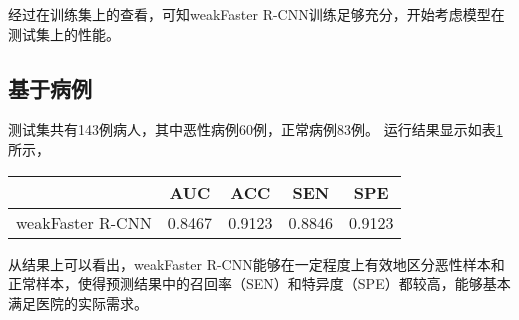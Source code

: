 \begin{comment}
此时体现的几个基于病例的指标结果如下：
\begin{itemize}
	\item 召回率88\%
	\item 精确度90\%
	\item 准确率91\%
\end{itemize}

预测结果如表\ref{tab:2_stage_2_pred_result_in_testing_set}所示，其中TP为51例，TN为71例，FP为12例，FN为9例。。
\begin{table}[!htbp]
    \bicaption{weakFaster R-CNN第二阶段测试集预测结果}{
The prediction result of testing set in the second stage of weakFaster R-CNN}
    \label{tab:2_stage_2_pred_result_in_testing_set}
    \centering
    \footnotesize%
    \setlength{\tabcolsep}{4pt}%
    \renewcommand{\arraystretch}{1.2}%
    \begin{tabular}{ccc}
        \hline
        &真实为恶性(60例)& 真实为良阴性（83例）\\
        \hline
        预测为恶性& 51 &12 \\
        预测为良阴性& 9 &71 \\
        \hline
    \end{tabular}
\end{table}
召回率为85\%，精确度为81\%，准确率为85\%。
\end{comment}
经过在训练集上的查看，可知weakFaster R-CNN训练足够充分，开始考虑模型在测试集上的性能。
\subsection{基于病例}
测试集共有143例病人，其中恶性病例60例，正常病例83例。
运行结果显示如表\ref{tab:2_stage_2_pred_result_based_on_patient}所示，
\begin{table}[!htbp]
    \label{tab:2_stage_2_pred_result_based_on_patient}
    \centering
    \footnotesize%
    \setlength{\tabcolsep}{4pt}%
    \renewcommand{\arraystretch}{1.2}%
    \begin{tabular}{ccccc}
        \hline
        &AUC& ACC &SEN &SPE\\
        \hline
        weakFaster R-CNN& 0.8467 &0.9123 &0.8846 &0.9123  \\
        \hline
    \end{tabular}
\end{table}
从结果上可以看出，weakFaster R-CNN能够在一定程度上有效地区分恶性样本和正常样本，使得预测结果中的召回率（SEN）和特异度（SPE）都较高，能够基本满足医院的实际需求。


